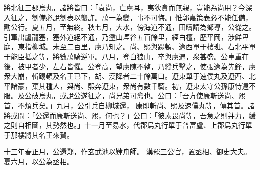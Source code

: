\begin{pinyinscope}
將北征三郡烏丸，諸將皆曰：「袁尚，亡虜耳，夷狄貪而無親，豈能為尚用？今深入征之，劉備必說劉表以襲許。萬一為變，事不可悔。」惟郭嘉策表必不能任備，勸公行。夏五月，至無終。秋七月，大水，傍海道不通，田疇請為鄉導，公從之。引軍出盧龍塞，塞外道絕不通，乃壍山堙谷五百餘里，經白檀，歷平岡，涉鮮卑庭，東指柳城。未至二百里，虜乃知之。尚、熙與蹋頓、遼西單于樓班、右北平單于能臣抵之等，將數萬騎逆軍。八月，登白狼山，卒與虜遇，衆甚盛。公車重在後，被甲者少，左右皆懼。公登高，望虜陳不整，乃縱兵擊之，使張遼為先鋒，虜衆大崩，斬蹋頓及名王已下，胡、漢降者二十餘萬口。遼東單于速僕丸及遼西、北平諸豪，棄其種人，與尚、熙奔遼東，衆尚有數千騎。初，遼東太守公孫康恃遠不服。及公破烏丸，或說公遂征之，尚兄弟可禽也。公曰：「吾方使康斬送尚、熙首，不煩兵矣。」九月，公引兵自柳城還，
康即斬尚、熙及速僕丸等，傳其首。諸將或問：「公還而康斬送尚、熙，何也？」公曰：「彼素畏尚等，吾急之則并力，緩之則自相圖，其勢然也。」十一月至易水，代郡烏丸行單于普富盧、上郡烏丸行單于那樓將其名王來賀。


十三年春正月，公還鄴，作玄武池以肄舟師。
漢罷三公官，置丞相、御史大夫。夏六月，以公為丞相。



\end{pinyinscope}
